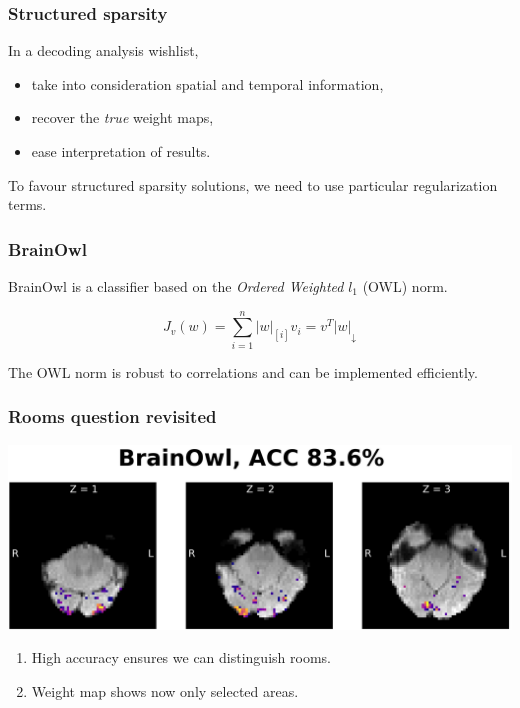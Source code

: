 \documentclass[11pt]{beamer}
\begin{document}
\begin{frame}
    \frametitle{Structured sparsity}
    In a decoding analysis wishlist,
    \begin{itemize}
        \item take into consideration spatial and temporal information, \pause
        \item recover the \emph{true} weight maps, \pause
        \item ease interpretation of results. \pause
    \end{itemize}

    To favour structured sparsity solutions, we need to use particular
    regularization terms.

\end{frame}

\begin{frame}
    \frametitle{BrainOwl}
    BrainOwl is a classifier based on the \emph{Ordered Weighted} $l_1$
    (OWL) norm.

    \[J_v(w) = \sum_{i=1}^{n} |w|_{[i]} v_i = v^T |w|_{\downarrow}\]

    The OWL norm is robust to correlations and can be implemented efficiently.

\end{frame}

\begin{frame}
    \frametitle{Rooms question revisited}

    \vspace*{-2cm}

    \begin{center}
        \includegraphics[scale=0.7]{figures/brainowl-axial.png}
    \end{center}

    \begin{enumerate}
        \item High accuracy ensures we can distinguish rooms.
        \item Weight map shows now only selected areas.
    \end{enumerate}

\end{frame}
\end{document}
